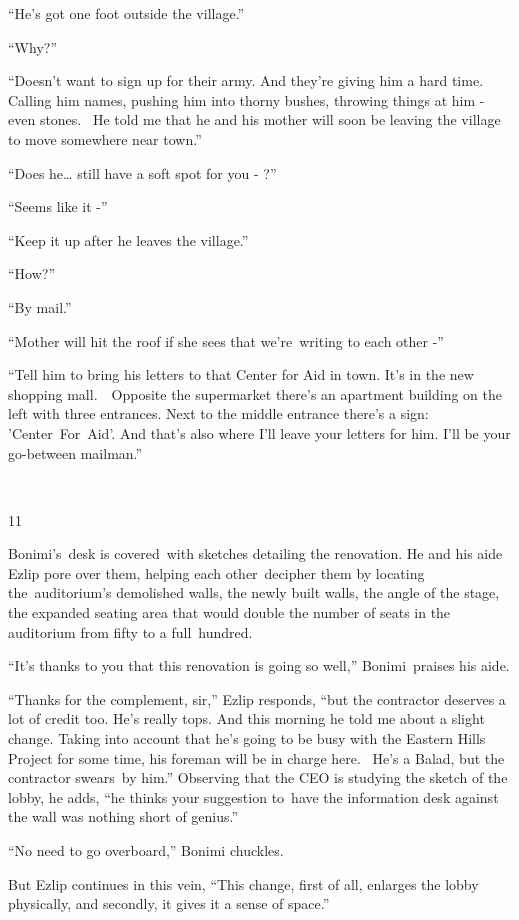 \documentclass[twoside,11pt]{book}
\begin{document}
``He's got one foot outside the village.'' 

``Why?''

``Doesn't want to sign up for their army. And they're giving him a hard time. Calling him names, pushing
him into thorny bushes, throwing things at him - even stones. ~He told me that he and his mother will soon be leaving
the village to move somewhere near town.'' 

``Does he{\dots} still have a soft spot for you - ?''

``Seems like it -'' 

``Keep it up after he leaves the village.'' 

``How?'' 

``By mail.'' 

``Mother will hit the roof if she sees that we're\ writing to each other -'' 

``Tell him to bring his letters to that Center for Aid in town. It's in the new shopping mall.\ \ Opposite
the supermarket there's an apartment building on the left with three entrances. Next to the middle entrance there's a
sign: 'Center\ For\ Aid'. And that's also where I'll leave your letters for him. I'll be your go-between
mailman.'' 

~

11 

Bonimi's~desk is covered{\ }with sketches detailing the renovation. He and his aide Ezlip pore over them,
helping each other~decipher them by locating the~auditorium's demolished walls, the newly built walls, the angle of the
stage, the expanded seating area that would double the number of seats in the auditorium from fifty to a
full{\ }hundred.~ 

{}``It's thanks to you that this renovation is going so well,'' Bonimi{\ }praises his aide.

``Thanks for the complement, sir,'' Ezlip responds, ``but the contractor deserves
a lot of credit too. He's really tops. And this morning he told me about a slight change. Taking into account that he's
going to be busy with the Eastern Hills Project for some time, his foreman will be in charge here. ~He's a Balad, but
the contractor swears{\ }by him.'' Observing that the CEO is studying the sketch of the
lobby, he adds, ``he thinks your suggestion to{\ }have the information desk against the
wall was nothing short of genius.'' 

``No need to go overboard,'' Bonimi chuckles. 

But Ezlip continues in this vein, ``This change, first of all, enlarges the lobby physically, and secondly,
it gives it a sense of space.''
\end{document}

